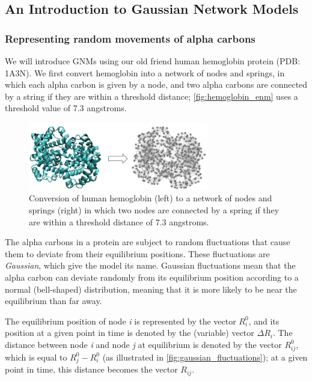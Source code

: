 \FloatBarrier
{}
\subsection{An Introduction to Gaussian Network Models}

\FloatBarrier
{}
\subsubsection{Representing random movements of alpha carbons}

We will introduce GNMs using our old friend human hemoglobin protein (PDB: 1A3N). We first convert hemoglobin into a network of nodes and springs, in which each alpha carbon is given by a node, and two alpha carbons are connected by a string if they are within a threshold distance; \autoref{fig:hemoglobin_enm} uses a threshold value of 7.3 angstroms.

\begin{figure}[h]
	\centering
	\mySfFamily
	\includegraphics[width = 0.7\textwidth]{../images/hemoglobin_enm.png}
	\caption{Conversion of human hemoglobin (left) to a network of nodes and springs (right) in which two nodes are connected by a spring if they are within a threshold distance of 7.3 angstroms.}
	\label{fig:hemoglobin_enm}
\end{figure}

The alpha carbons in a protein are subject to random fluctuations that cause them to deviate from their equilibrium positions. These fluctuations are \textit{Gaussian}, which give the model its name. Gaussian fluctuations mean that the alpha carbon can deviate randomly from its equilibrium position according to a normal (bell-shaped) distribution, meaning that it is more likely to be near the equilibrium than far away.

The equilibrium position of node \textit{i} is represented by the vector $ R_i^0 $, and its position at a given point in time is denoted by the (variable) vector $ \Delta R_i $. The distance between node \textit{i} and node \textit{j} at equilibrium is denoted by the vector $ R_{ij}^0 $, which is equal to $ R_j^0 - R_i^0 $ (as illustrated in \autoref{fig:gaussian_fluctuations}); at a given point in time, this distance becomes the vector $ R_{ij} $.

